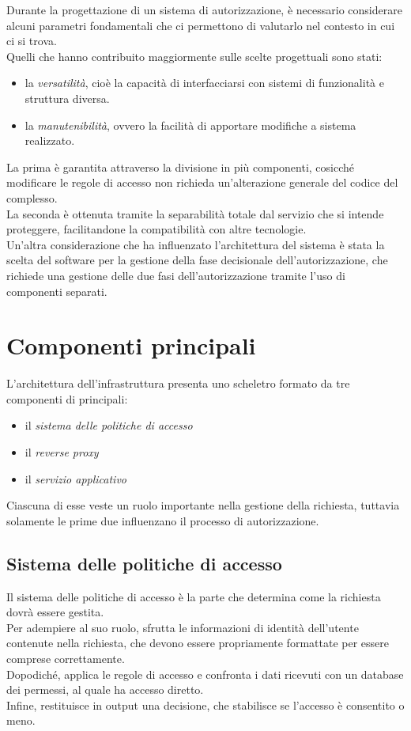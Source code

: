 Durante la progettazione di un sistema di autorizzazione, è necessario considerare alcuni parametri fondamentali
 che ci permettono di valutarlo 
nel contesto in cui ci si trova.
\\ Quelli che hanno contribuito maggiormente sulle scelte progettuali sono stati:
\begin{itemize}
    \item la \textit{versatilità}, cioè la capacità di interfacciarsi con sistemi di 
    funzionalità e struttura diversa.
    \item la \textit{manutenibilità}, ovvero la facilità di apportare modifiche a sistema realizzato.
\end{itemize}
La prima è garantita attraverso la divisione in più componenti, cosicché modificare le regole di accesso non richieda
un'alterazione generale del codice del complesso. 
\\ La seconda è ottenuta tramite la separabilità totale dal servizio che si intende proteggere,
 facilitandone la compatibilità con altre tecnologie.  
\\ Un'altra considerazione che ha influenzato l'architettura del sistema è stata la scelta del software per la gestione 
della fase decisionale dell'autorizzazione, che richiede una gestione delle due fasi dell'autorizzazione tramite l'uso di componenti separati. 

\section{Componenti principali}

L'architettura dell'infrastruttura presenta uno scheletro formato da tre componenti di principali: 
\begin{itemize}
    \item il \textit{sistema delle politiche di accesso}
    \item il \textit{reverse proxy}
    \item il \textit{servizio applicativo}
\end{itemize}
Ciascuna di esse veste un ruolo importante nella gestione della richiesta, tuttavia solamente le prime due influenzano il processo di autorizzazione. 

\subsection{Sistema delle politiche di accesso}
Il sistema delle politiche di accesso è la parte che determina come la richiesta dovrà essere gestita. 
\\ Per adempiere al suo ruolo, sfrutta le informazioni di identità dell'utente contenute nella richiesta, 
che devono essere propriamente formattate per essere comprese correttamente. 
\\ Dopodiché, applica le regole di accesso e confronta i dati ricevuti con un database dei permessi, al quale ha accesso diretto.
\\ Infine, restituisce in output una decisione, che stabilisce se l'accesso è consentito o meno.  

